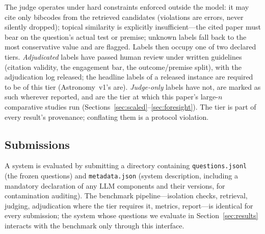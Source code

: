 The judge operates under hard constraints enforced outside the model:
it may cite only bibcodes from the retrieved candidates (violations are
errors, never silently dropped); topical similarity is explicitly
insufficient---the cited paper must bear on the question's actual test
or premise; unknown labels fall back to the most conservative value and
are flagged. Labels then occupy one of two declared tiers.
\emph{Adjudicated} labels have passed human review under written
guidelines (citation validity, the engagement bar, the outcome/premise
split), with the adjudication log released; the headline labels of a
released instance are required to be of this tier (Astronomy~v1's are).
\emph{Judge-only} labels have not, are marked as such wherever
reported, and are the tier at which this paper's large-$n$ comparative
studies run (Sections~\ref{sec:scaled}--\ref{sec:foresight}). The
tier is part of every result's provenance; conflating them is a
protocol violation.

\subsection{Submissions}
A system is evaluated by submitting a directory containing
\texttt{questions.jsonl} (the frozen questions) and
\texttt{metadata.json} (system description, including a mandatory
declaration of any LLM components and their versions, for contamination
auditing). The benchmark pipeline---isolation checks, retrieval,
judging, adjudication where the tier requires it, metrics,
report---is identical for every
submission; the system whose questions we evaluate in
Section~\ref{sec:results} interacts with the benchmark only through
this interface.
